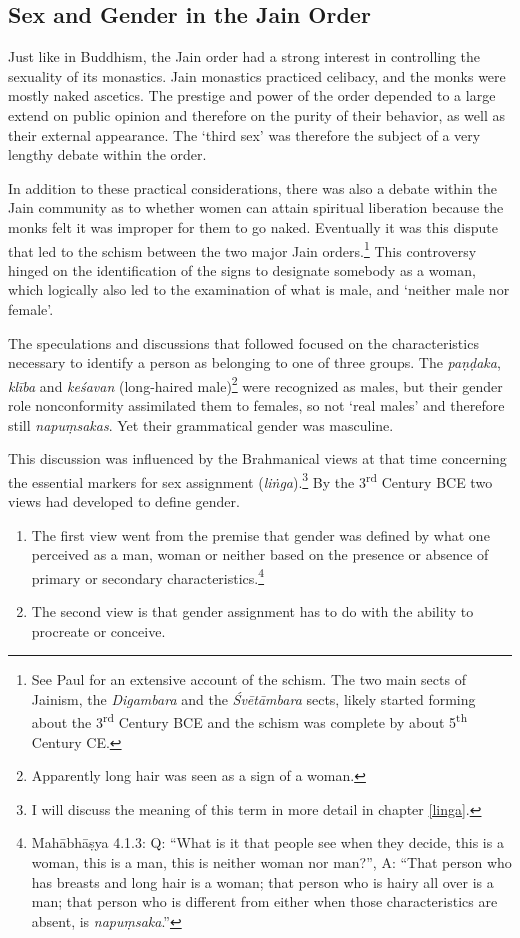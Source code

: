 \subsection{Sex and Gender in the Jain Order}
Just like in Buddhism, the Jain order had a strong interest in controlling the sexuality of its monastics. Jain monastics practiced celibacy, and the monks were mostly naked ascetics. The prestige and power of the order depended to a large extend on public opinion and therefore on the purity of their behavior, as well as their external appearance. The `third sex' was therefore the subject of a very lengthy debate within the order. 

In addition to these practical considerations, there was also a debate within the Jain community as to whether women can attain spiritual liberation because the monks felt it was improper for them to go naked. Eventually it was this dispute that led to the schism between the two major Jain orders.\footnote{See Paul \cite{dudas} for an extensive account of the schism. The two main sects of Jainism, the {\em Digambara} and the {\em Śvētāmbara} sects, likely started forming about the 3\textsuperscript{rd} Century BCE and the schism was complete by about 5\textsuperscript{th} Century CE.} This controversy hinged on the identification of the signs to designate somebody as a woman, which logically also led to the examination of what is male, and `neither male nor female'. 

The speculations and discussions that followed focused on the characteristics necessary to identify a person as belonging to one of three groups. The {\em paṇḍaka}, {\em klība} and {\em keśavan} (long-haired male)\footnote{Apparently long hair was seen as a sign of a woman.} were recognized as males, but their gender role nonconformity assimilated them to females, so not `real males' and therefore still {\em napuṃsakas}. Yet their grammatical gender was masculine.

This discussion was influenced by the Brahmanical views at that time concerning the essential markers for sex assignment ({\em liṅga}).\footnote{I will discuss the meaning of this term in more detail in chapter \ref{linga}.} By the 3\textsuperscript{rd} Century BCE two views had developed to define gender.

\begin{enumerate}
 \item The first view went from the premise that gender was defined by what one perceived as a man, woman or neither based on the presence or absence of primary or secondary characteristics.\footnote{Mahābhāṣya 4.1.3: Q: ``What is it that people see when they decide, this is a woman, this is a man, this is neither woman nor man?'', A: ``That person who has breasts and long hair is a woman; that person who is hairy all over is a man; that person who is different from either when those characteristics are absent, is {\em napuṃsaka}.''}
 \item The second view is that gender assignment has to do with the ability to procreate or conceive. 
\end{enumerate}

